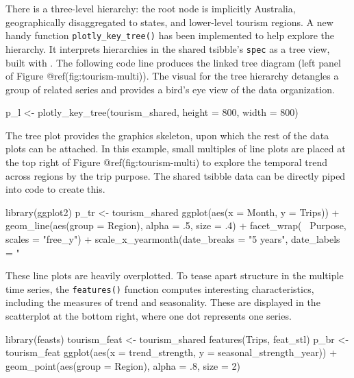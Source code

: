 \noindent There is a three-level hierarchy: the root node is implicitly
Australia, geographically disaggregated to states, and lower-level
tourism regions. A new handy function \texttt{plotly\_key\_tree()} has
been implemented to help explore the hierarchy. It interprets
hierarchies in the shared tsibble's \texttt{spec} as a tree view, built
with . The following code line produces the linked tree
diagram (left panel of Figure @ref(fig:tourism-multi)). The visual for
the tree hierarchy detangles a group of related series and provides a
bird's eye view of the data organization.

\begin{Schunk}
\begin{Sinput}
p_l <- plotly_key_tree(tourism_shared, height = 800, width = 800)
\end{Sinput}
\end{Schunk}

The tree plot provides the graphics skeleton, upon which the rest of the
data plots can be attached. In this example, small multiples of line
plots are placed at the top right of Figure @ref(fig:tourism-multi) to
explore the temporal trend across regions by the trip purpose. The
shared tsibble data can be directly piped into  code to
create this.

\begin{Schunk}
\begin{Sinput}
library(ggplot2)
p_tr <- tourism_shared %
  ggplot(aes(x = Month, y = Trips)) +
  geom_line(aes(group = Region), alpha = .5, size = .4) +
  facet_wrap(~ Purpose, scales = "free_y") +
  scale_x_yearmonth(date_breaks = "5 years", date_labels = "%
\end{Sinput}
\end{Schunk}

These line plots are heavily overplotted. To tease apart structure in
the multiple time series, the \texttt{features()} function computes
interesting characteristics, including the measures of trend and
seasonality. These are displayed in the scatterplot at the bottom right,
where one dot represents one series.

\begin{Schunk}
\begin{Sinput}
library(feasts)
tourism_feat <- tourism_shared %
  features(Trips, feat_stl)
p_br <- tourism_feat %
  ggplot(aes(x = trend_strength, y = seasonal_strength_year)) +
  geom_point(aes(group = Region), alpha = .8, size = 2)
\end{Sinput}
\end{Schunk}

